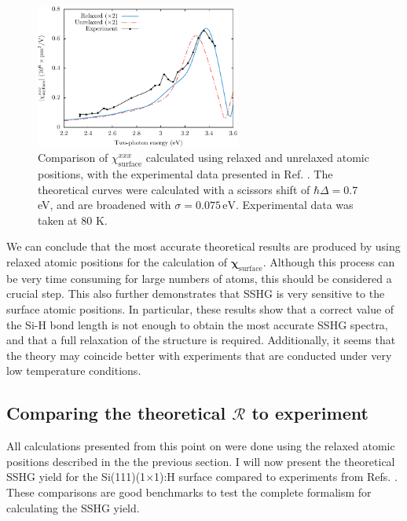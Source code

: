\begin{figure}[H]
\centering
\includegraphics[width=0.6\textwidth]{content/figures/fig-Si1x1-Hofer_Xxxx}
\caption{Comparison of
$\chi^{xxx}_{\mathrm{surface}}$ calculated using relaxed and unrelaxed
atomic positions, with the experimental data presented in Ref.
\cite{hoferAPA96}. The theoretical curves were calculated with a scissors shift
of $\hbar\Delta = 0.7$ eV, and are broadened with $\sigma=0.075\,\text{eV}$.
Experimental data was taken at 80 K.}
\label{fig:Xxxx}
\end{figure}

We can conclude that the most accurate theoretical results are produced by using
relaxed atomic positions for the calculation of
$\boldsymbol{\chi}_{\mathrm{surface}}$. Although this process can be very time
consuming for large numbers of atoms, this should be considered a crucial step.
This also further demonstrates that SSHG is very sensitive to the surface atomic
positions. In particular, these results show that a correct value of the Si-H
bond length is not enough to obtain the most accurate SSHG spectra, and that a
full relaxation of the structure is required. Additionally, it seems that the
theory may coincide better with experiments that are conducted under very low
temperature conditions.



\subsection{Comparing the theoretical \texorpdfstring{$\mathcal{R}$}{R} to
experiment}
\label{sec:1x1sshgyield}

All calculations presented from this point on were done using the relaxed atomic
positions described in the the previous section. I will now present the
theoretical SSHG yield for the Si(111)(1$\times$1):H surface compared to
experiments from Refs. \cite{mitchellSS01, mejiaPRB02, bergfeldPRL04}. These
comparisons are good benchmarks to test the complete formalism for calculating
the SSHG yield.

